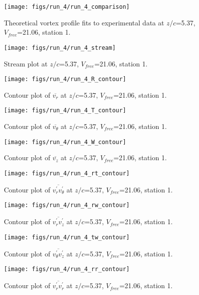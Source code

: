 \begin{figure}[H]
\centering
\texttt{[image: figs/run\_4/run\_4\_comparison]}
\caption{Theoretical vortex profile fits to experimental data at $z/c$=5.37, $V_{free}$=21.06, station 1.}
\end{figure}


\begin{figure}[H]
\centering
\texttt{[image: figs/run\_4/run\_4\_stream]}
\caption{Stream plot at $z/c$=5.37, $V_{free}$=21.06, station 1.}
\end{figure}


\begin{figure}[H]
\centering
\texttt{[image: figs/run\_4/run\_4\_R\_contour]}
\caption{Contour plot of $\overline{v_{r}}$ at $z/c$=5.37, $V_{free}$=21.06, station 1.}
\end{figure}


\begin{figure}[H]
\centering
\texttt{[image: figs/run\_4/run\_4\_T\_contour]}
\caption{Contour plot of $\overline{v_{\theta}}$ at $z/c$=5.37, $V_{free}$=21.06, station 1.}
\end{figure}


\begin{figure}[H]
\centering
\texttt{[image: figs/run\_4/run\_4\_W\_contour]}
\caption{Contour plot of $\overline{v_{z}}$ at $z/c$=5.37, $V_{free}$=21.06, station 1.}
\end{figure}


\begin{figure}[H]
\centering
\texttt{[image: figs/run\_4/run\_4\_rt\_contour]}
\caption{Contour plot of $\overline{v_{r}^{\prime} v_{\theta}^{\prime}}$ at $z/c$=5.37, $V_{free}$=21.06, station 1.}
\end{figure}


\begin{figure}[H]
\centering
\texttt{[image: figs/run\_4/run\_4\_rw\_contour]}
\caption{Contour plot of $\overline{v_{r}^{\prime} v_{z}^{\prime}}$ at $z/c$=5.37, $V_{free}$=21.06, station 1.}
\end{figure}


\begin{figure}[H]
\centering
\texttt{[image: figs/run\_4/run\_4\_tw\_contour]}
\caption{Contour plot of $\overline{v_{\theta}^{\prime} v_{z}^{\prime}}$ at $z/c$=5.37, $V_{free}$=21.06, station 1.}
\end{figure}


\begin{figure}[H]
\centering
\texttt{[image: figs/run\_4/run\_4\_rr\_contour]}
\caption{Contour plot of $\overline{v_{r}^{\prime} v_{r}^{\prime}}$ at $z/c$=5.37, $V_{free}$=21.06, station 1.}
\end{figure}


